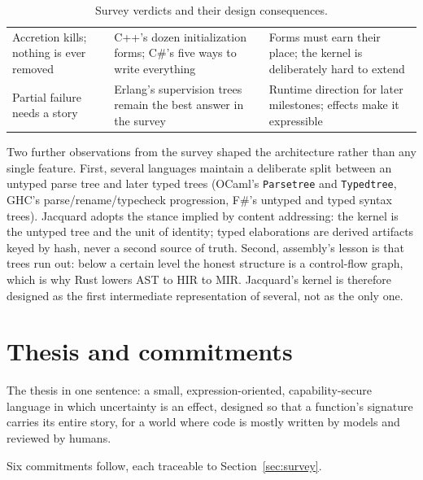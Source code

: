 \documentclass[11pt]{article}
\newcommand{\jacquard}{Jacquard}
\begin{document}
\begin{table}[ht]
\begin{tabularx}{\textwidth}{@{}p{}Xp{}@{}}
\addlinespace
Accretion kills; nothing is ever removed & C++'s dozen initialization forms; C\#'s five ways to write everything & Forms must earn their place; the kernel is deliberately hard to extend \\
\addlinespace
Partial failure needs a story & Erlang's supervision trees remain the best answer in the survey \cite{armstrong2003} & Runtime direction for later milestones; effects make it expressible \\
\bottomrule
\end{tabularx}
\caption{Survey verdicts and their design consequences.}
\label{tab:verdicts}
\end{table}

Two further observations from the survey shaped the architecture rather than any single feature. First, several languages maintain a deliberate split between an untyped parse tree and later typed trees (OCaml's \texttt{Parsetree} and \texttt{Typedtree}, GHC's parse/rename/typecheck progression, F\#'s untyped and typed syntax trees). \jacquard{} adopts the stance implied by content addressing: the kernel is the untyped tree and the unit of identity; typed elaborations are derived artifacts keyed by hash, never a second source of truth. Second, assembly's lesson is that trees run out: below a certain level the honest structure is a control-flow graph, which is why Rust lowers AST to HIR to MIR. \jacquard's kernel is therefore designed as the first intermediate representation of several, not as the only one.

\section{Thesis and commitments}
\label{sec:commitments}

The thesis in one sentence: a small, expression-oriented, capability-secure language in which uncertainty is an effect, designed so that a function's signature carries its entire story, for a world where code is mostly written by models and reviewed by humans.

Six commitments follow, each traceable to Section~\ref{sec:survey}.
\end{document}
